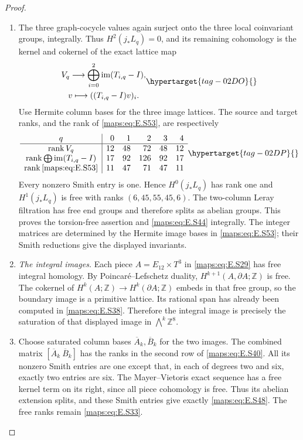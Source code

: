 \documentclass[11pt,a4paper]{article}
\numberwithin{equation}{section}
\theoremstyle{definition}
\begin{document}
\begin{proof}
\begin{enumerate}[label=\arabic*.,leftmargin=*]
\item The three graph-cocycle values again surject onto the
three local coinvariant groups, integrally. Thus $H^2(j_*L_q)=0$,
and its remaining cohomology is the kernel and cokernel
of the exact lattice map
\begin{equation}
 \begin{gathered}
 V_q\longrightarrow
        \bigoplus_{i=0}^2\operatorname{im}(T_{i,q}-I),\\
           v\longmapsto((T_{i,q}-I)v)_i.
 \end{gathered}
 \hypertarget{tag-02DO}{}\label{maps:eq:E.S53}
\end{equation}
Use Hermite column bases for the three image lattices. The source and target ranks,
and the rank of \eqref{maps:eq:E.S53}, are respectively
\begin{equation}
 \begin{array}{c|rrrrr}
 q&0&1&2&3&4\\ \hline
 \operatorname{rank}V_q&12&48&72&48&12\\
 \operatorname{rank}\bigoplus\operatorname{im}(T_{i,q}-I)
                      &17&92&126&92&17\\
 \operatorname{rank}\eqref{maps:eq:E.S53}&11&47&71&47&11
 \end{array}
 \hypertarget{tag-02DP}{}\label{maps:eq:E.S54}
\end{equation}
Every nonzero Smith entry is one. Hence $H^0(j_*L_q)$
has rank one and $H^1(j_*L_q)$ is free with ranks
$(6,45,55,45,6)$. The two-column Leray filtration has
free end groups and therefore splits as abelian groups.
This proves the torsion-free assertion and \eqref{maps:eq:E.S44}
integrally. The integer matrices are determined by the Hermite image bases in
\eqref{maps:eq:E.S53}; their Smith reductions give the displayed invariants.

\item \emph{The integral images.}
Each piece $A=E_{12}\times T^3$ in \eqref{maps:eq:E.S29} has free
integral homology. By Poincar\'e--Lefschetz duality,
$H^{k+1}(A,\partial A;\mathbb Z)$ is free. The cokernel
of $H^k(A;\mathbb Z)\to H^k(\partial A;\mathbb Z)$
embeds in that free group, so the boundary image is a
primitive lattice. Its rational span has already been
computed in \eqref{maps:eq:E.S38}. Therefore the integral
image is precisely the saturation of that displayed
image in $\bigwedge^k\mathbb Z^8$.

\item Choose saturated column bases $\overline A_k,\overline B_k$
for the two images. The combined matrix
$[\overline A_k\ \overline B_k]$ has the ranks in the
second row of \eqref{maps:eq:E.S40}. All its nonzero Smith entries are
one except that, in each of degrees two and six, exactly
two entries are six. The Mayer--Vietoris exact sequence
has a free kernel term on its right, since all piece
cohomology is free. Thus its abelian extension splits,
and these Smith entries give exactly \eqref{maps:eq:E.S48}. The free
ranks remain \eqref{maps:eq:E.S33}.


\end{enumerate}
\end{proof}
\end{document}
